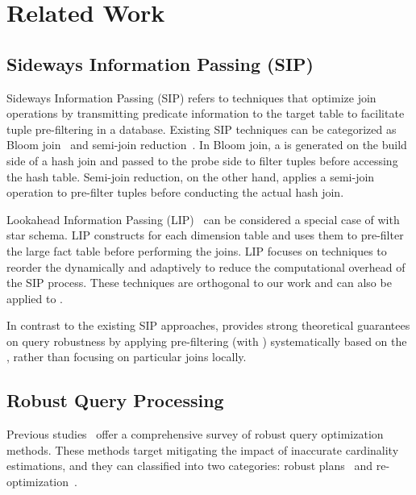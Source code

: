 \section{Related Work}
\label{sec:related}

\subsection{Sideways Information Passing (SIP)}

Sideways Information Passing (SIP) refers to techniques that optimize join operations by transmitting predicate information to the target table to facilitate tuple pre-filtering in a database. Existing SIP techniques can be categorized as Bloom join~\cite{bloomjoin, distributedbloomjoin, optimizingdistributedbloomjoin, zhu2017LIP} and semi-join reduction~\cite{usingsemi}. In Bloom join, a \BF is generated on the build side of a hash join and passed to the probe side to filter tuples before accessing the hash table. Semi-join reduction, on the other hand, applies a semi-join operation to pre-filter tuples before conducting the actual hash join.

Lookahead Information Passing (LIP)~\cite{zhu2017LIP} can be considered a special case of \RPT with star schema. LIP constructs \BFs for each dimension table and uses them to pre-filter the large fact table before performing the joins. LIP focuses on techniques to reorder the \BFs dynamically and adaptively to reduce the computational overhead of the SIP process. These techniques are orthogonal to our work and can also be applied to \rpt.

In contrast to the existing SIP approaches, \RPT provides strong theoretical guarantees on query robustness by applying pre-filtering (with \BFs) systematically based on the \YannAlg, rather than focusing on particular joins locally.

\subsection{Robust Query Processing}

Previous studies~\cite{2019tutorial_robust, robustoptimization} offer a comprehensive survey of robust query optimization methods. These methods target mitigating the impact of inaccurate cardinality estimations, and they can classified into two categories: robust plans~\cite{2002LEC, 2005RCE, 2007plan_diagram, 2008strict_plan_diagram, Abhirama2010BDSH, AlyoubiHW15, Wolf2018RobustMetric} and re-optimization~\cite{1998reopt, 1999reopt_shared_nothing, 2000eddies, 2004pop, 2007pop_parallel, 2016planbouquets, Perron19, 2023reopt_zhao, justen2024polar}.

